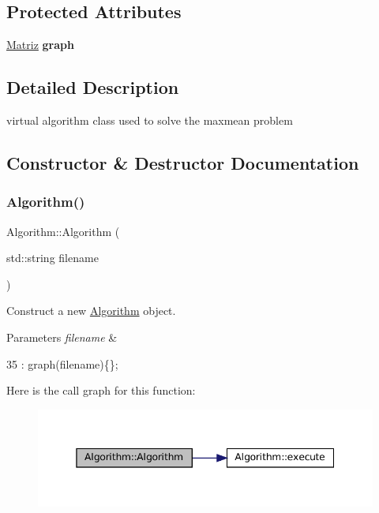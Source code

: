 \subsection*{Protected Attributes}
\begin{DoxyCompactItemize}
\item 
\mbox{\label{classAlgorithm_ac738351f4331aee2fb965f689b7be273}} 
\hyperlink{classMatriz}{Matriz} {\bfseries graph}
\end{DoxyCompactItemize}


\subsection{Detailed Description}
virtual algorithm class used to solve the maxmean problem 

\subsection{Constructor \& Destructor Documentation}
\mbox{\label{classAlgorithm_a89df1d2c6751f70733f38daa0ee2a13b}} 
\subsubsection{\texorpdfstring{Algorithm()}{Algorithm()}}
{\footnotesize\ttfamily Algorithm\+::\+Algorithm (\begin{DoxyParamCaption}\item[{std\+::string}]{filename }\end{DoxyParamCaption})\hspace{0.3cm}{\ttfamily [inline]}}



Construct a new \hyperlink{classAlgorithm}{Algorithm} object. 


\begin{DoxyParams}{Parameters}
{\em filename} & \\
\hline
\end{DoxyParams}

\begin{DoxyCode}
35 : graph(filename)\{\};
\end{DoxyCode}
Here is the call graph for this function\+:\nopagebreak
\begin{figure}[H]
\begin{center}
\leavevmode
\includegraphics[width=345pt]{classAlgorithm_a89df1d2c6751f70733f38daa0ee2a13b_cgraph}
\end{center}
\end{figure}


